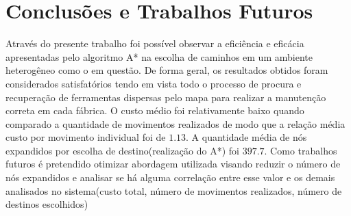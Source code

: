 \documentclass[12pt]{article}
\begin{document}
\section{Conclusões e Trabalhos Futuros} \label{sec:Conclusoes}
Através do presente trabalho foi possível observar a eficiência e eficácia apresentadas pelo algoritmo A* na escolha de caminhos em um ambiente heterogêneo como o em questão. De forma geral, os resultados obtidos foram considerados satisfatórios tendo em vista todo o processo de procura e recuperação de ferramentas dispersas pelo mapa para realizar a manutenção correta em cada fábrica. O custo médio foi relativamente baixo quando comparado a quantidade de movimentos realizados de modo que a relação média custo por movimento individual foi de $1.13$. A quantidade média de nós expandidos por escolha de destino(realização do A*) foi $397.7$. Como trabalhos futuros é pretendido otimizar abordagem utilizada visando reduzir o número de nós expandidos e analisar se há alguma correlação entre esse valor e os demais analisados no sistema(custo total, número de movimentos realizados, número de destinos escolhidos)
% 
% 
\end{document}
